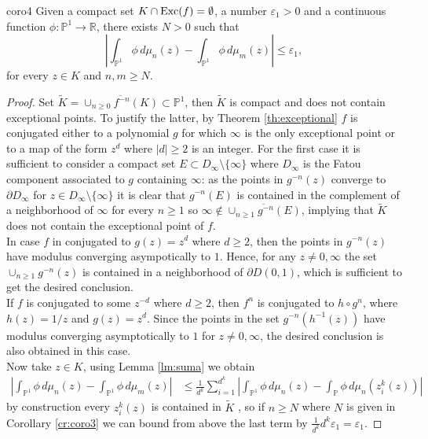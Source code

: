 \begin{mycoro}{}{coro4}
Given a compact set $K\cap \text{Exc}(f)=\emptyset$, a number $\varepsilon_1>0$ and a continuous function $\phi:\mathbb{P}^1 \rightarrow \mathbb{R}$, there exists $N>0$ such that 
$$\left | \int_{\mathbb{P}^1} \phi \, d\mu_n(z) - \int_{\mathbb{P}^1}\phi \, d\mu_m(z) \right | \leq \varepsilon_1,$$
for every $z\in K$ and $n,m\geq N$.\\
\end{mycoro}

\begin{proof}
Set $\tilde{K} = \overline{\cup_{n\geq 0} f^{-n}(K)}\subset \mathbb{P}^1$, then $\tilde{K}$ is compact and does not contain exceptional points. To justify the latter, by Theorem \ref{th:exceptional} $f$ is conjugated either to a polynomial $g$ for which $\infty$ is the only exceptional point or to a map of the form $z^d$ where $|d|\geq 2$ is an integer. For the first case it is sufficient to consider a compact set $E\subset D_\infty\setminus \{\infty\}$ where $D_\infty$ is the Fatou component associated to $g$ containing $\infty$: as the points in $g^{-n}(z)$ converge to $\partial D_\infty$ for $z\in D_\infty\setminus \{\infty\}$ it is clear that $g^{-n}(E)$ is contained in the complement of a neighborhood of $\infty$ for every $n\geq 1$ so $\infty\not \in \overline{\cup_{n\geq 1} g^{-n}(E)}$, implying that $\tilde{K}$ does not contain the exceptional point of $f$.\\

In case $f$ in conjugated to $g(z)=z^d$ where $d\geq 2$, then the points in $g^{-n}(z)$ have modulus converging asympotically to $1$. Hence, for any $z\neq 0,\infty$ the set $\cup_{n\geq 1} g^{-n}(z)$ is contained in a neighborhood of $\partial D(0,1)$, which is sufficient to get the desired conclusion.\\

If $f$ is conjugated to some $z^{-d}$ where $d\geq 2$, then $f^{n}$ is conjugated to $h\circ g^n$, where $h(z)=1/z$ and $g(z)=z^d$. Since the points in the set $g^{-n}(h^{-1}(z))$ have modulus converging asymptotically to $1$ for $z\neq 0,\infty$, the desired conclusion is also obtained in this case.\\

Now take $z \in K$, using Lemma \ref{lm:suma} we obtain
\begin{align*}
\left| \int_{\mathbb{P}^1} \phi \, d\mu_n(z) - \int_{\mathbb{P}^1}\phi \, d\mu_m(z) \right | & \leq \frac{1}{d^k} \sum_{i=1}^{d^k} \left |\int_{\mathbb{P}^1} \phi \, d\mu_n(z) - \int_{\mathbb{P}} \phi \,  d\mu_n(z_i^k(z)) \right|
\end{align*}
by construction every $z_i^k(z)$ is contained in $\tilde{K}$ , so if $n\geq N$ where $N$ is given in Corollary \ref{cr:coro3} we can bound from above the last term by $\frac{1}{d^k}d^k\varepsilon_1 = \varepsilon_1$. 
\end{proof}

